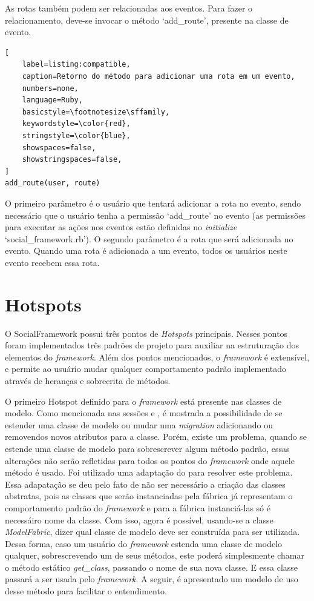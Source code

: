 As rotas também podem ser relacionadas aos eventos. Para fazer o relacionamento, deve-se invocar o método `add\_route', presente na classe de evento.

\begin{lstlisting}[
    label=listing:compatible,
    caption=Retorno do método para adicionar uma rota em um evento,
    numbers=none,
    language=Ruby,
    basicstyle=\footnotesize\sffamily,
    keywordstyle=\color{red},
    stringstyle=\color{blue},
    showspaces=false,
    showstringspaces=false,
]
add_route(user, route)
\end{lstlisting}

O primeiro parâmetro é o usuário que tentará adicionar a rota no evento, sendo necessário que o usuário tenha a permissão `add\_route' no evento (as permissões para executar as ações nos eventos estão definidas no \textit{initialize} `social\_framework.rb'). O segundo parâmetro é a rota que será adicionada no evento. Quando uma rota é adicionada a um evento, todos os usuários neste evento recebem essa rota.

\section{Hotspots}
\label{sec:hotspots}

O SocialFramework possui três pontos de \textit{Hotspots} principais. Nesses pontos foram implementados três padrões de projeto para auxiliar na estruturação dos elementos do \textit{framework}. Além dos pontos mencionados, o \textit{framework} é extensível, e permite ao usuário mudar qualquer comportamento padrão implementado através de heranças e sobrecrita de métodos.

O primeiro Hotspot definido para o \textit{framework} está presente nas classes de modelo. Como mencionada nas sessões  e , é mostrada a possibilidade de se estender uma classe de modelo ou mudar uma \textit{migration} adicionando ou removendos novos atributos para a classe. Porém, existe um problema, quando se estende uma classe de modelo para sobrescrever algum método padrão, essas alterações não serão refletidas para todos os pontos do \textit{framework} onde aquele método é usado. Foi utilizado uma adaptação do  para resolver este problema. Essa adapatação se deu pelo fato de não ser necessário a criação das classes abstratas, pois as classes que serão instanciadas pela fábrica já representam o comportamento padrão do \textit{framework} e para a fábrica instanciá-las só é necessáiro nome da classe. Com isso, agora é possível, usando-se a classe \textit{ModelFabric}, dizer qual classe de modelo deve ser construída para ser utilizada. Dessa forma, caso um usuário do \textit{framework} estenda uma classe de modelo qualquer, sobrescrevendo um de seus métodos, este poderá simplesmente chamar o método estático \textit{get\_class}, passando o nome de sua nova classe. E essa classe passará a ser usada pelo \textit{framework}. A seguir, é apresentado um modelo de uso desse método para facilitar o entendimento.

